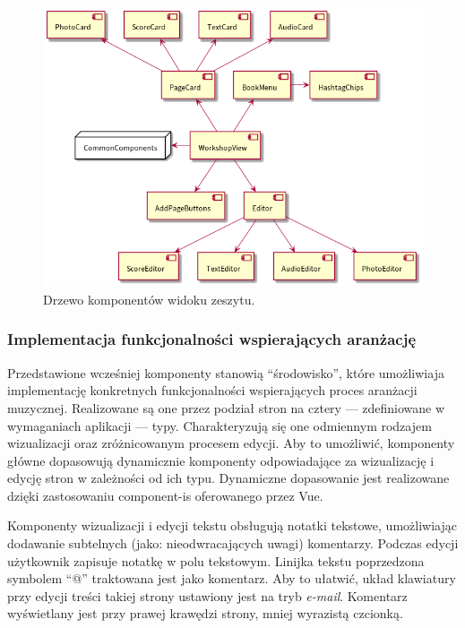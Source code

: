 \begin{figure}[H]
	\begin{center}
		\includegraphics[scale=0.6]{media/WorkshopComponents.png}
	\end{center}
	\caption{Drzewo komponentów widoku zeszytu.}
	\label{rys:workshop-components}
\end{figure}

\subsubsection{Implementacja funkcjonalności wspierających aranżację}
Przedstawione wcześniej komponenty stanowią \enquote{środowisko}, które umożliwiaja implementację konkretnych funkcjonalności
wspierających proces aranżacji muzycznej. Realizowane są one przez podział stron na cztery — zdefiniowane w wymaganiach aplikacji — typy.
Charakteryzują się one odmiennym rodzajem wizualizacji oraz zróżnicowanym procesem edycji. Aby to umożliwić, komponenty główne
dopasowują dynamicznie komponenty odpowiadające za wizualizację i edycję stron w zależności od ich typu.
Dynamiczne dopasowanie jest realizowane dzięki zastosowaniu component-is oferowanego przez Vue.

Komponenty wizualizacji i edycji tekstu obsługują notatki tekstowe, umożliwiając dodawanie subtelnych (jako: nieodwracających uwagi)
komentarzy. Podczas edycji użytkownik zapisuje notatkę w polu tekstowym. Linijka tekstu poprzedzona symbolem \enquote{@} traktowana jest
jako komentarz. Aby to ułatwić, układ klawiatury przy edycji treści takiej strony ustawiony jest na tryb \textit{e-mail}.
Komentarz wyświetlany jest przy prawej krawędzi strony, mniej wyrazistą czcionką.

